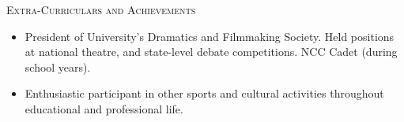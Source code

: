 



\textsc{Extra-Curriculars} \textsc{and} A\textsc{chievements}

\begin{itemize}[left=1.3em, labelsep=1em, labelwidth=2em, align=parleft]
    \item President of University's Dramatics and Filmmaking Society. Held positions at national theatre, and state-level debate competitions. NCC Cadet (during school years).
    \item Enthusiastic participant in other sports and cultural activities throughout educational and professional life.
\end{itemize}
